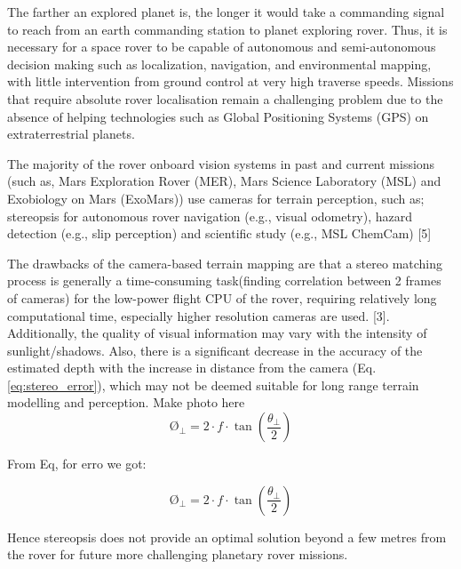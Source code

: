 The farther an explored planet is, the longer it would take a commanding signal to reach from an earth commanding station to planet exploring rover.
Thus, it is necessary for a space rover to be capable of autonomous and semi-autonomous decision making such as localization, navigation, and environmental mapping, with little intervention from ground control at very high traverse speeds. Missions that require absolute rover localisation remain a challenging problem due to the absence of helping technologies such as Global Positioning Systems (GPS) on extraterrestrial planets.

The majority of the rover onboard vision systems in past and current missions (such as, Mars
Exploration Rover (MER), Mars Science Laboratory (MSL) and Exobiology on Mars (ExoMars)) use
cameras for terrain perception, such as; stereopsis for autonomous rover navigation (e.g., visual odometry), hazard detection (e.g., slip perception) and scientific study (e.g., MSL ChemCam) [5] %

The drawbacks of the camera-based terrain mapping are that
a stereo matching process is generally a time-consuming task(finding correlation between 2 frames of cameras) for the low-power flight CPU of the rover, requiring relatively long computational time, especially higher resolution cameras are used. [3]. Additionally, the
quality of visual information may vary with the intensity of sunlight/shadows. %
Also, there is a significant decrease in the accuracy of the estimated depth with the increase in distance from the camera (Eq. \ref{eq:stereo_error}), which may not be deemed suitable for long range terrain modelling and perception. 
Make photo here
\begin{equation}\label{eq:stereo_error}
\text{\O}_{\perp} = 2 \cdot f \cdot \tan{(\frac{\theta_{\perp}}{2})}
\end{equation}

From Eq, for erro we got:

\begin{equation}\label{eq:stereo_error}
\text{\O}_{\perp} = 2 \cdot f \cdot \tan{(\frac{\theta_{\perp}}{2})}
\end{equation}

Hence stereopsis does not provide an optimal solution beyond a few metres from the rover for future more challenging planetary rover missions.

